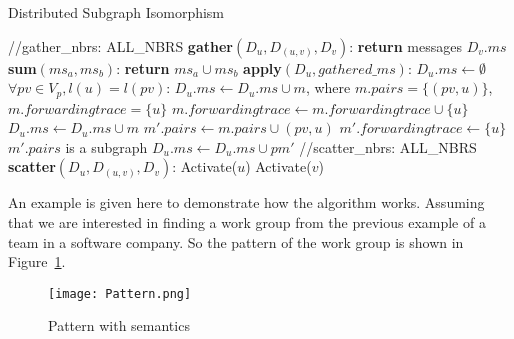 	\begin{Algorithmus}[H]
	\label{alg:GAS_DSI}
	\caption{Distributed Subgraph Isomorphism}	
	\begin{algorithmic}[1]
	
	\State //gather\_nbrs: ALL\_NBRS
	\State \textbf{gather}$(D_u, D_{(u,v)}, D_v)$: 
	\State \textbf{return} messages $D_v.ms$
	\newline
	\State \textbf{sum}$(ms_a, ms_b)$: 
	\State \textbf{return} $ms_a \cup ms_b$
	\newline
	\State \textbf{apply}$(D_u, gathered\_ms)$:
	\State $D_u.ms \leftarrow \emptyset$
		\State $\forall pv \in V_p, l(u)=l(pv)$: $D_u.ms \leftarrow D_u.ms \cup m$, where $m.pairs = \{(pv, u)\}$, $m.forwardingtrace = \{u\}$   
	\Else		
					\State $m.forwardingtrace \leftarrow m.forwardingtrace \cup \{u\}$ 
					\State $D_u.ms \leftarrow D_u.ms \cup m$
				\EndIf
			\Else
						\State $m'.pairs \leftarrow m.pairs \cup (pv,u)$
						\State $m'.forwardingtrace \leftarrow \{u\}$	
							\State $m'.pairs$ is a subgraph
						\Else
							\State $D_u.ms \leftarrow D_u.ms \cup pm'$
						\EndIf		
					\EndIf
				\EndFor		
			\EndIf
		\EndFor		
	\EndIf	
	\newline
	\State  //scatter\_nbrs: ALL\_NBRS
	\State \textbf{scatter}$(D_u, D_{(u,v)}, D_v)$:
		\State 	Activate($u$)
		\State 	Activate($v$)
	\EndIf

	\end{algorithmic}	
	\end{Algorithmus}

An example is given here to demonstrate how the algorithm works. Assuming that we are interested in finding a work group from the previous example of a team in a software company. So the pattern of the work group is shown in Figure~\ref{fig:BasicPattern}.

\begin{figure}[H]
  \begin{center}
    \texttt{[image: Pattern.png]}
    \caption{Pattern with semantics}
    \label{fig:BasicPattern}
  \end{center}
\end{figure}

